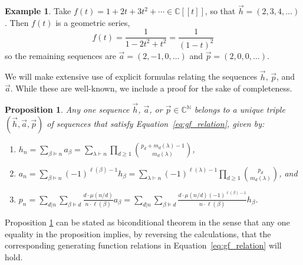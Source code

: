 \documentclass[11pt]{amsart}
\newtheorem{proposition}[theorem]{Proposition}
\theoremstyle{definition}
\newtheorem{example}[theorem]{Example}
\newtheorem{remark}[theorem]{Remark}
\numberwithin{equation}{section}
\def\NN{{\mathbb N}}
\def\CC{{\mathbb C}}
\begin{document}
\begin{example}
Take $f(t) = 1 + 2t + 3 t^{2} + \cdots \in \CC[[t]]$, so that $\vec{h} = (2, 3, 4, \ldots)$.  Then $f(t)$ is a geometric series,
\[
f(t) = \frac{1}{1 - 2 t^{2} + t^{2}} = \frac{1}{(1-t)^{2}}
\]
so the remaining sequences are $\vec{a} = (2, -1, 0, \ldots)$ and $\vec{p} = (2, 0, 0, \ldots)$.
\end{example}

We will make extensive use of explicit formulas relating the sequences $\vec{h}$, $\vec{p}$, and $\vec{a}$.  While these are well-known, we include a proof for the sake of completeness.

\begin{proposition}
\label{prop:sequences}
Any one sequence $\vec{h}$, $\vec{a}$, or $\vec{p} \in \CC^{\NN}$ belongs to a unique triple $(\vec{h}, \vec{a}, \vec{p})$ of sequences that satisfy Equation~\eqref{eq:gf_relation}, given by:
\begin{enumerate}[label = (\roman*), itemsep = 1em]
\item $\displaystyle h_{n}
= \sum_{\beta \vDash n} a_\beta
= \sum_{\lambda \vdash n} \prod_{d \geq 1} \binom{p_d + m_d(\lambda) -1}{m_d(\lambda)}$, 

\item $\displaystyle a_n
= \sum_{\beta \vDash n} (-1)^{\ell(\beta)-1} h_\beta
= \sum_{\lambda \vdash n} (-1)^{\ell(\lambda)-1} \prod_{d \geq 1} \binom{p_d}{m_d(\lambda)}$, and

\item $\displaystyle p_n
= \sum_{d|n} \sum_{\beta \vDash d} \frac{d\cdot \mu(n/d)}{n \cdot \ell(\beta)} a_\beta
= \sum_{d|n} \sum_{\beta \vDash d} \frac{d\cdot \mu(n/d) (-1)^{\ell(\beta)-1}}{n \cdot \ell(\beta)} h_\beta$.

\end{enumerate}
\end{proposition}

Proposition \ref{prop:sequences} can be stated as biconditional theorem in the sense
that any one equality in the proposition implies, by reversing the calculations,
that the corresponding generating function relations in Equation~\eqref{eq:gf_relation}
will hold.
\end{document}

